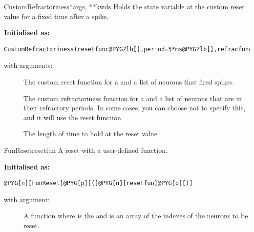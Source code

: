 \documentclass[letterpaper,10pt,english]{manual}
\begin{document}
\hypertarget{brian.CustomRefractoriness}{}\begin{classdesc}{CustomRefractoriness}{*args, **kwds}
Holds the state variable at the custom reset value for a fixed time after a spike.

\textbf{Initialised as:}

\begin{Verbatim}[commandchars=@\[\]]
CustomRefractoriness(resetfunc@PYGZlb[],period=5*ms@PYGZlb[],refracfunc=resetfunc@PYGZrb[]@PYGZrb[])
\end{Verbatim}

with arguments:
\begin{description}
\item[] \leavevmode
The custom reset function  for  a
\hyperlink{brian.NeuronGroup}{} and  a list of neurons that
fired spikes.

\item[] \leavevmode
The custom refractoriness function  for  a
\hyperlink{brian.NeuronGroup}{} and  a list of neurons that are in
their refractory periods. In some cases, you can choose not to specify this,
and it will use the reset function.

\item[] \leavevmode
The length of time to hold at the reset value.

\end{description}
\end{classdesc}

\hypertarget{brian.FunReset}{}\begin{classdesc}{FunReset}{resetfun}
A reset with a user-defined function.

\textbf{Initialised as:}

\begin{Verbatim}[commandchars=@\[\]]
@PYG[n][FunReset]@PYG[p][(]@PYG[n][resetfun]@PYG[p][)]
\end{Verbatim}

with argument:
\begin{description}
\item[] \leavevmode
A function  where  is the
\hyperlink{brian.NeuronGroup}{} and  is an array of
the indexes of the neurons to be reset.

\end{description}
\end{classdesc}
\end{document}
